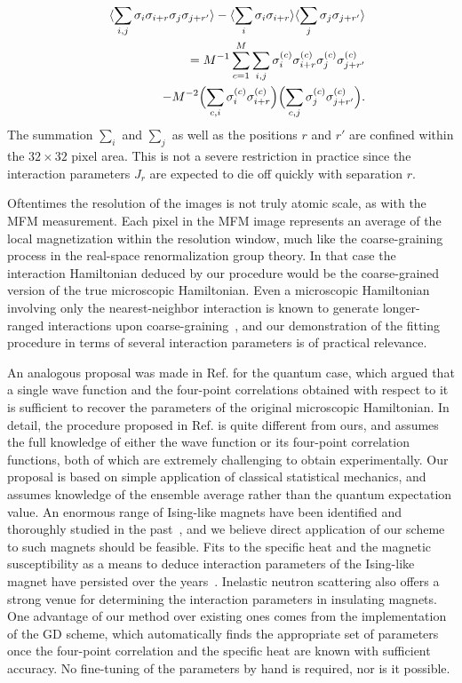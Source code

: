 \documentclass[reprint,amsmath,amssymb,aps,showpacs,superscriptaddress,prb]{revtex4-1}
\newcommand{\ba}{\begin{eqnarray}}
\newcommand{\ea}{\end{eqnarray}}
\newcommand{\nn}{\nonumber \\}
\begin{document}
\ba && \langle \sum_{i,j}  \sigma_i \sigma_{i+r} \sigma_j \sigma_{j+r'}  \rangle - \langle \sum_i \sigma_i \sigma_{i+r} \rangle \langle \sum_j \sigma_j \sigma_{j+r'} \rangle\nn
%
&& = M^{-1} \sum_{c=1}^M \sum_{i,j}  \sigma_i^{(c)} \sigma_{i+r}^{(c)}\sigma_j^{(c)} \sigma_{j+r'}^{(c)} \nn
&& ~~~~~ - M^{-2} \Bigl( \sum_{c, i } \sigma_i^{(c)} \sigma_{i+r}^{(c)} \Bigr) \Bigl( \sum_{c,j} \sigma_j^{(c)} \sigma_{j+r'}^{(c)} \Bigr) . \ea
The summation $\sum_i$ and $\sum_j$ as well as the positions $r$ and $r'$ are confined within the $32\times 32$ pixel area. This is not a severe restriction in practice since the interaction parameters $J_r$ are expected to die off quickly with separation $r$.

Oftentimes the resolution of the images is not truly atomic scale, as with the MFM measurement. Each pixel in the MFM image represents an average of the local magnetization within the resolution window, much like the coarse-graining process in the real-space renormalization group theory. In that case the interaction Hamiltonian deduced by our procedure would be the coarse-grained version of the true microscopic Hamiltonian. Even a microscopic Hamiltonian involving only the nearest-neighbor interaction is known to generate longer-ranged interactions upon coarse-graining~\cite{stat-mech}, and our demonstration of the fitting procedure in terms of several interaction parameters is of practical relevance.

An analogous proposal was made in Ref.  for the quantum case, which argued that a single wave function and the four-point correlations obtained with respect to it is sufficient to recover the parameters of the original microscopic Hamiltonian. In detail, the procedure proposed in Ref.  is quite different from ours, and assumes the full knowledge of either the wave function or its four-point correlation functions, both of which are extremely challenging to obtain experimentally. Our proposal is based on simple application of classical statistical mechanics, and assumes knowledge of the ensemble average rather than the quantum expectation value. An enormous range of Ising-like magnets have been identified and thoroughly studied in the past~\cite{Ising-magnets}, and we believe direct application of our scheme to such magnets should be feasible. Fits to the specific heat and the magnetic susceptibility as a means to deduce interaction parameters of the Ising-like magnet have persisted over the years~\cite{Ising-magnets}. Inelastic neutron scattering also offers a strong venue for determining the interaction parameters in insulating magnets. One advantage of our method over existing ones comes from the implementation of the GD scheme, which automatically finds the appropriate set of parameters once the four-point correlation and the specific heat are known with sufficient accuracy. No fine-tuning of the parameters by hand is required, nor is it possible.
\end{document}
